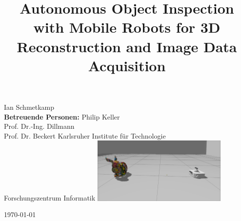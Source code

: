 \documentclass{beamer}
\date{}
\title{Autonomous Object Inspection with Mobile Robots for 3D Reconstruction and Image Data Acquisition}
\begin{document}
\begin{frame}
	\centering
	\maketitle
	\vspace{-2cm}
	Ian Schmetkamp\footnotemark[1] \\ \textbf{Betreuende Personen:} Philip Keller\footnotemark[2] \\ Prof. Dr.-Ing. Dillmann\footnotemark[2] \\ Prof. Dr. Beckert\footnotemark[1]
	\vfill
	\footnotesize{ \footnotemark[1]Karlsruher Institute für Technologie \\  \footnotemark[2]Forschungszentrum Informatik}
	\vfill
	\includegraphics[width=0.5\textwidth]{Graphics/tbandbunny.png}

	\today
\end{frame}
\end{document}
